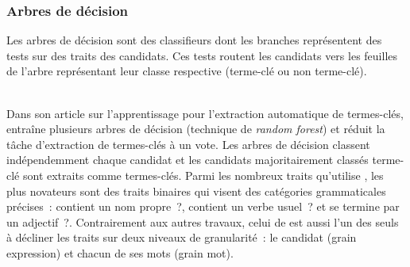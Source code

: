       \subsubsection{Arbres de décision}
      \label{subsubsec:main-state_of_the_art-automatic_keyphrase_extraction-supervised_keyphrase_extraction-decision_trees}
        Les arbres de décision sont des classifieurs dont les branches
        représentent des tests sur des traits des candidats. Ces tests routent
        les candidats vers les feuilles de l'arbre représentant leur classe
        respective (\og{}terme-clé\fg{} ou \og{}non terme-clé\fg{}).

        ~\\Dans son article sur l'apprentissage pour l'extraction automatique de
        termes-clés,  entraîne plusieurs
        arbres de décision (technique de \textit{random forest}) et réduit la
        tâche d'extraction de termes-clés à un vote. Les arbres de décision
        classent indépendemment chaque candidat et les candidats majoritairement
        classés \og{}terme-clé\fg{} sont extraits comme termes-clés. Parmi les
        nombreux traits qu'utilise , les
        plus novateurs sont des traits binaires qui visent des catégories
        grammaticales précises~: \og{}contient un nom propre~?\fg{},
        \og{}contient un verbe usuel~?\fg{} et \og{}se termine par un
        adjectif~?\fg{}. Contrairement aux autres travaux, celui de
         est aussi l'un des seuls à
        décliner les traits sur deux niveaux de granularité~: le candidat (grain
        expression) et chacun de ses mots (grain mot).

